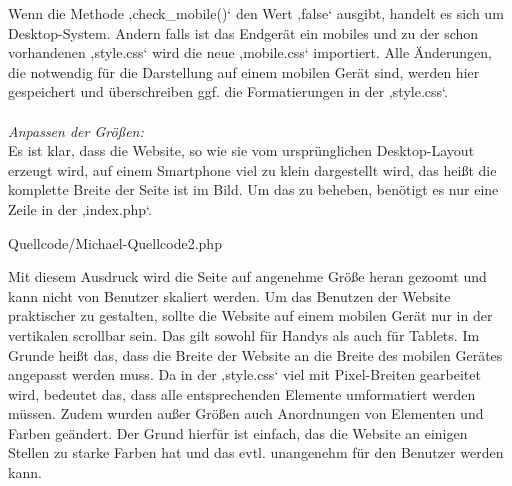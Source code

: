 Wenn die Methode ‚check\_mobile()‘ den Wert ‚false‘ ausgibt, handelt es sich um Desktop-System. Andern falls ist das Endgerät ein mobiles und zu der schon vorhandenen ‚style.css‘ wird die neue ‚mobile.css‘ importiert. Alle Änderungen, die notwendig für die Darstellung auf einem mobilen Gerät sind, werden hier gespeichert und überschreiben ggf. die Formatierungen in der ‚style.css‘. \\ \\

\textit{Anpassen der Größen:}
\\
Es ist klar, dass die Website, so wie sie  vom ursprünglichen Desktop-Layout erzeugt wird, auf einem Smartphone viel zu klein dargestellt wird, das heißt die komplette Breite der Seite ist im Bild. Um das zu beheben, benötigt es nur eine Zeile in der ‚index.php‘.

\begin{center}
	\begin{lstinputlisting}[language=PHP, caption={Auszug aus der Index-Datei}]
		{Quellcode/Michael-Quellcode2.php}
	\end{lstinputlisting}
\end{center}

Mit diesem Ausdruck wird die Seite auf angenehme Größe heran gezoomt und kann nicht von Benutzer skaliert werden. 
Um das Benutzen der Website praktischer zu gestalten, sollte die Website auf einem mobilen Gerät nur in der vertikalen scrollbar sein. Das gilt sowohl für Handys als auch für Tablets. Im Grunde heißt das, dass die Breite der Website an die Breite des mobilen Gerätes angepasst werden muss. Da in der ‚style.css‘ viel mit Pixel-Breiten gearbeitet wird, bedeutet das, dass alle entsprechenden Elemente umformatiert werden müssen.
Zudem wurden außer Größen auch Anordnungen von Elementen und Farben geändert. Der Grund hierfür ist einfach, das die Website an einigen Stellen zu starke Farben hat und das evtl. unangenehm für den Benutzer werden kann. 



